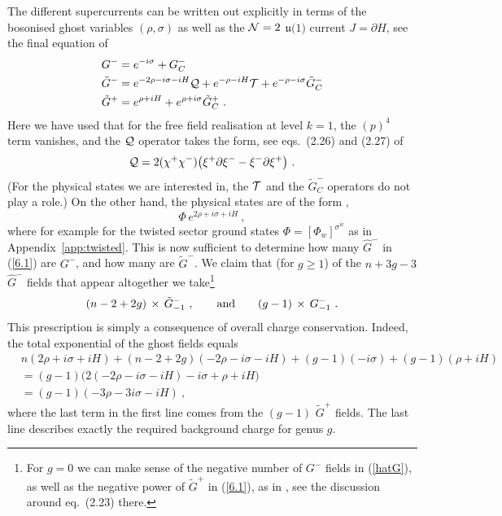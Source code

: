 \documentclass[a4paper,11pt]{article}
\numberwithin{equation}{section}
\def\be{\begin{equation}}
\def\ee{\end{equation}}
\begin{document}
The different supercurrents can be written out explicitly in terms of the bosonised ghost variables $(\rho, \sigma)$ as well as the ${\cal N}=2$ $\mathfrak{u(}1)$ current $J=\partial H$, see the final equation of \cite{Berkovits:1999im}
\begin{align}
G^- & = e^{-i \sigma} + G_C^- \\
\tilde{G}^- & = e^{-2\rho - i \sigma - i H} {\cal Q} + e^{-\rho - i H} {\cal T} + e^{-\rho - i \sigma} \tilde{G}_C^- \\
\tilde{G}^+ & = e^{\rho+i H}+ e^{\rho+i \sigma}\tilde{G}_C^+ \ .
\end{align}
Here we have used that for the free field realisation at level $k=1$, the $(p)^4$ term vanishes, and the ${\cal Q}$ operator takes the form, see eqs.~(2.26) and (2.27) of \cite{Gerigk:2012cq}
\be
{\cal Q} = 2 ({\chi}^+ {\chi}^-) \bigl(\xi^+ \partial \xi^- - \xi^- \partial \xi^+ \bigr) \ . 
\ee
(For the physical states we are interested in, the ${\cal T}$ and the $\tilde{G}_C^-$ operators do not play a role.) On the other hand, the physical states are of the form \cite{Gerigk:2012cq}, 
\be\label{physical}
\Phi\, e^{2\rho + i \sigma + i H} \ , 
\ee
where for example for the twisted sector ground states $\Phi = [\Phi_w]^{\sigma^w}$ as in Appendix~\ref{app:twisted}. This is now sufficient to determine how many $\hat{G}^-$ in (\ref{6.1}) are $G^-$, and how many are $\tilde{G}^-$. We claim that (for $g\geq 1$) of the $n+3g-3$ $\hat{G}^-$ fields that appear altogether we take\footnote{For $g=0$ we can make sense of the negative number of $G^{-}$ fields in  (\ref{hatG}), as well as the negative power of $\tilde{G}^+$ in (\ref{6.1}), as in \cite{Berkovits:1994vy}, see the discussion around eq.~(2.23) there.}
\be\label{hatG}
(n-2+2g) \, \times \, \tilde{G}^{-}_{-1}  \ , \qquad \hbox{and} \qquad (g - 1) \, \times \, G^-_{-1} \ . 
\ee
This prescription is simply a consequence of overall charge conservation. Indeed, the total exponential of the ghost fields equals
\begin{align}
& n (2\rho + i \sigma + iH) + (n-2+2g) (-2 \rho - i \sigma - iH) +(g-1) (-i\sigma) + (g-1) (\rho+iH) \nonumber \\
& =  (g-1) \bigl( 2 (-2 \rho - i \sigma - iH)  - i\sigma + \rho + iH\bigr) \nonumber \\
& = (g-1) ( -3\rho -3 i \sigma - iH) \ ,
\end{align} 
where the last term in the first line comes from the $(g-1)$ $\tilde{G}^+$ fields. The last line describes exactly the required background charge for genus $g$. 
\end{document}
